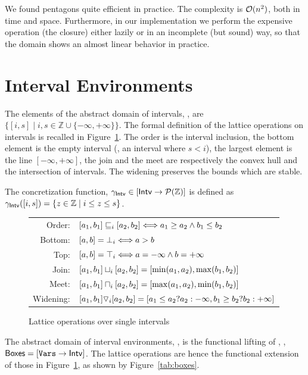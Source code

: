 \documentclass{elsart}
\begin{document}
We found pentagons quite efficient in practice. 
The complexity is $\mathcal{O}(n^2)$, both in time and space.
Furthermore, in our implementation we perform the expensive operation
(the closure) either lazily or in an incomplete (but sound) way, so
that the domain shows an almost linear behavior in practice.

\section{Interval Environments}
The elements of the abstract domain of intervals, \Intervals, are $\{ [i, s] \mid i,s \in \mathbb{Z} \cup \{-\infty, + \infty\} \}$.
The formal definition of the lattice operations on intervals is recalled in Figure~\ref{tab:intervals}.
The order is the interval inclusion, the bottom  element is the empty
interval (\ie, an interval where $s < i$), the largest element is the
line $[-\infty, +\infty]$, the join and the meet are respectively the
convex hull and the intersection of intervals.
The widening preserves the bounds which are stable. 

The concretization function, $\gamma_{\mathsf{Intv}} \in [\mathsf{Intv} \rightarrow\mathcal{P}{(\mathbb{Z})}]$ is defined as $\gamma_{\mathsf{Intv}}([i, s]) = \{ z \in \mathbb{Z} \mid i \leq z \leq s\}$.

\begin{figure}
\small
\begin{tabular}{rl}
Order:& $[a_1, b_1] \sqsubseteq_i [a_2, b_2] \Longleftrightarrow a_1 \geq a_2 \wedge b_1 \leq b_2$ \\
Bottom:& $ [a, b] = {\bot}_i \Longleftrightarrow a > b$ \\
Top:& $[a, b] = {\top}_i \Longleftrightarrow a = -\infty \wedge b = +\infty$\\
Join:& $[a_1, b_1] \sqcup_i [a_2, b_2] = [\mathrm{min}(a_1, a_2), \mathrm{max}(b_1, b_2)]$ \\
Meet:& $[a_1, b_1] \sqcap_i [a_2, b_2] = [\mathrm{max}(a_1, a_2), \mathrm{min}(b_1, b_2)]$ \\
Widening:& $[a_1, b_1] \triangledown_i [a_2, b_2] = [a_1 \leq a_2 ? a_2 : -\infty, b_1 \geq b_2 ? b_2 : +\infty]$ \\
\end{tabular}
\caption{Lattice operations over single intervals}
\label{tab:intervals}
\end{figure}

The abstract domain of interval environments, \Boxes, is the functional lifting of \Intervals, \ie, $\mathsf{Boxes} =  [\mathtt{Vars} \rightarrow\mathsf{Intv}]$.
The lattice operations are hence the functional extension of those in Figure~\ref{tab:intervals}, as shown by Figure~\ref{tab:boxes}.
\end{document}
